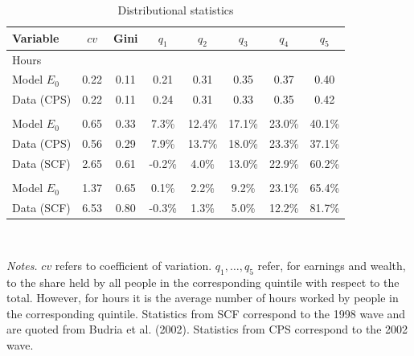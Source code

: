 \begin{table}[!htbp]
\centering
\caption{Distributional statistics}
\begin{tabular}{lccccccc}
\toprule
Variable & $cv$ & Gini & $q_1$ & $q_2$ & $q_3$ & $q_4$ & $q_5$ \\
\midrule
\multicolumn{8}{l}{Hours} \\
Model $E_0$ & 0.22 & 0.11 & 0.21 & 0.31 & 0.35 & 0.37 & 0.40 \\
Data (CPS) & 0.22 & 0.11 & 0.24 & 0.31 & 0.33 & 0.35 & 0.42 \\
\addlinespace
\multicolumn{8}{l}{Earnings} \\
Model $E_0$ & 0.65 & 0.33 & 7.3\% & 12.4\% & 17.1\% & 23.0\% & 40.1\% \\
Data (CPS) & 0.56 & 0.29 & 7.9\% & 13.7\% & 18.0\% & 23.3\% & 37.1\% \\
Data (SCF) & 2.65 & 0.61 & -0.2\% & 4.0\% & 13.0\% & 22.9\% & 60.2\% \\
\addlinespace
\multicolumn{8}{l}{Wealth} \\
Model $E_0$ & 1.37 & 0.65 & 0.1\% & 2.2\% & 9.2\% & 23.1\% & 65.4\% \\
Data (SCF) & 6.53 & 0.80 & -0.3\% & 1.3\% & 5.0\% & 12.2\% & 81.7\% \\
\bottomrule
\end{tabular}
\\[3ex]
\raggedright\footnotesize{\textit{Notes.} $cv$ refers to coefficient of variation. $q_1, \dots, q_5$ refer, for earnings and wealth, to the share held by all people in the corresponding quintile with respect to the total. However, for hours it is the average number of hours worked by people in the corresponding quintile. Statistics from SCF correspond to the 1998 wave and are quoted from Budria et al. (2002). Statistics from CPS correspond to the 2002 wave.}\\
\normalsize
\end{table}
